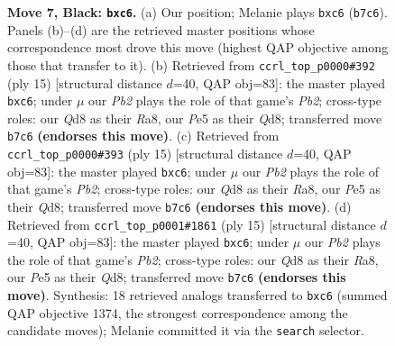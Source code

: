 \documentclass[11pt]{article}
\begin{document}
\begin{figure}[p]
\caption{\textbf{Move 7, Black: \texttt{bxc6}.} (a) Our position; Melanie plays \texttt{bxc6} (\texttt{b7c6}). Panels (b)--(d) are the retrieved master positions whose correspondence most drove this move (highest QAP objective among those that transfer to it). (b) Retrieved from \texttt{ccrl\_top\_p0000\#392} (ply 15) [structural distance $d$=40, QAP obj=83]: the master played \texttt{bxc6}; under $\mu$ our \emph{Pb2} plays the role of that game's \emph{Pb2}; cross-type roles: our \emph{Q}d8 as their \emph{R}a8, our \emph{P}e5 as their \emph{Q}d8; transferred move \texttt{b7c6} \textbf{(endorses this move)}. (c) Retrieved from \texttt{ccrl\_top\_p0000\#393} (ply 15) [structural distance $d$=40, QAP obj=83]: the master played \texttt{bxc6}; under $\mu$ our \emph{Pb2} plays the role of that game's \emph{Pb2}; cross-type roles: our \emph{Q}d8 as their \emph{R}a8, our \emph{P}e5 as their \emph{Q}d8; transferred move \texttt{b7c6} \textbf{(endorses this move)}. (d) Retrieved from \texttt{ccrl\_top\_p0001\#1861} (ply 15) [structural distance $d$=40, QAP obj=83]: the master played \texttt{bxc6}; under $\mu$ our \emph{Pb2} plays the role of that game's \emph{Pb2}; cross-type roles: our \emph{Q}d8 as their \emph{R}a8, our \emph{P}e5 as their \emph{Q}d8; transferred move \texttt{b7c6} \textbf{(endorses this move)}. Synthesis: 18 retrieved analogs transferred to \texttt{bxc6} (summed QAP objective 1374, the strongest correspondence among the candidate moves); Melanie committed it via the \texttt{search} selector.}
\label{fig:thought-m13}
\end{figure}

\clearpage
\end{document}

